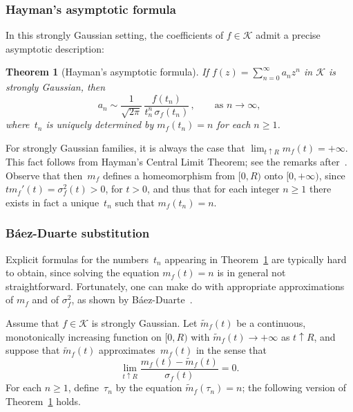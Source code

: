 \documentclass[12pt]{amsart}
\newtheorem{theoremL}{Theorem}
\theoremstyle{definition}
\begin{document}
\subsubsection{Hayman's asymptotic formula}\label{subsubsec:Haymanformula}

In this strongly Gaussian setting, the coefficients
of $f\in\mathcal{K}$ admit a precise asymptotic description:

\begin{theoremL}[Hayman's asymptotic formula]\label{thm:hayman asympt formula}
If $f(z)=\sum_{n=0}^{\infty} a_n z^n$ in $\mathcal{K}$ is strongly
Gaussian, then
\[
a_n \sim \frac{1}{\sqrt{2\pi}}\, \frac{f(t_n)}{t_n^n\, \sigma_f(t_n)}\,, \qquad \text{as } n\to\infty,
\]
where~$t_n$ is uniquely determined by $m_f(t_n)=n$ for each $n\ge 1$.
\end{theoremL}

For strongly Gaussian families, it is always the case that $\lim_{t\uparrow R} m_f(t)=+\infty$. This
fact follows from Hayman's Central Limit Theorem; see the remarks after~\cite[Theorem~A,
Section~3.2]{CFMK}. Observe that then~$m_f$ defines a homeomorphism from $[0,R)$ onto $[0,+\infty)$,
since $t m_f'(t)=\sigma_f^2(t)>0$, for $t>0$, and thus that for each integer $n\ge 1$ there exists in
fact a unique~$t_n$ such that $m_f(t_n)=n$.


\subsubsection{B\'aez-Duarte substitution}\label{subsubsec:BDsubst}

Explicit formulas for the numbers~$t_n$ appearing in Theorem~\ref{thm:hayman asympt formula} are typically hard to obtain, since solving the equation $m_f(t)=n$ is in general
not straightforward. Fortunately, one can make do with appropriate approximations of
$m_f$ and of $\sigma_f^2$, as shown by B\'aez-Duarte~\cite{BaezDuarte}.

Assume that $f\in\mathcal{K}$ is strongly Gaussian. Let $\tilde{m}_f(t)$ be a continuous, monotonically
increasing function on $[0,R)$ with $\tilde{m}_f(t)\to+\infty$ as $t\uparrow R$, and suppose that $\tilde{m}_f(t)$
approximates~$m_f(t)$ in the sense that
\begin{equation}\label{eq:BDapprox}
\lim_{t\uparrow R} \frac{m_f(t)-\tilde{m}_f(t)}{\sigma_f(t)} = 0.
\end{equation}
For each $n\ge 1$, define~$\tau_n$ by the equation $\tilde{m}_f(\tau_n)=n$; the following version of
Theorem~\ref{thm:hayman asympt formula} holds.
\end{document}
